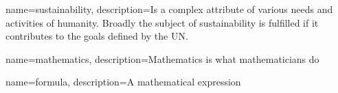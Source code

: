 {
        name=sustainability,
        description={Is a complex attribute of various needs and activities of humanity. Broadly the subject of sustainability is fulfilled if it contributes to the goals defined by the UN.\cite{UN_sustain}}
}

{
        name=mathematics,
        description={Mathematics is what mathematicians do}
}

{
        name=formula,
        description={A mathematical expression}
}




